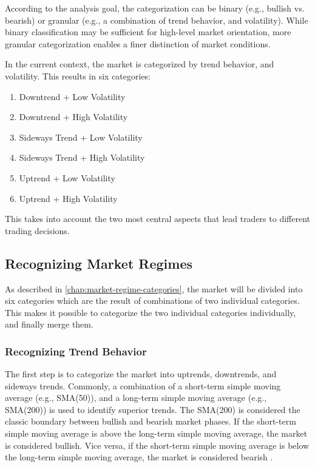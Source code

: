 \noindent
According to the analysis goal, the categorization can be binary (e.g., bullish vs. bearish) or granular (e.g., a combination of trend behavior, and volatility).
While binary classification may be sufficient for high-level market orientation, more granular categorization enables a finer distinction of market conditions.

In the current context, the market is categorized by trend behavior, and volatility.
This results in six categories:

\begin{enumerate}
    \item Downtrend + Low Volatility
    \item Downtrend + High Volatility
    \item Sideways Trend + Low Volatility
    \item Sideways Trend + High Volatility
    \item Uptrend + Low Volatility
    \item Uptrend + High Volatility
\end{enumerate}

\noindent
This takes into account the two most central aspects that lead traders to different trading decisions.

\subsection{Recognizing Market Regimes}

As described in \autoref{chap:market-regime-categories}, the market will be divided into six categories which are the result of combinations of two individual categories.
This makes it possible to categorize the two individual categories individually, and finally merge them.

\subsubsection{Recognizing Trend Behavior}
\label{chap:recognizing-trend}

The first step is to categorize the market into uptrends, downtrends, and sideways trends.
Commonly, a combination of a short-term simple moving average (e.g., SMA(50)), and a long-term simple moving average (e.g., SMA(200)) is used to identify superior trends.
The SMA(200) is considered the classic boundary between bullish and bearish market phases.
If the short-term simple moving average is above the long-term simple moving average, the market is considered bullish.
Vice versa, if the short-term simple moving average is below the long-term simple moving average, the market is considered bearish \cite{ig-regimes-mas}.

